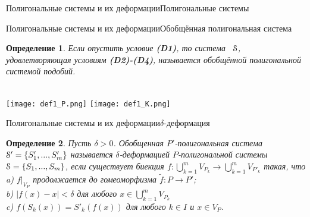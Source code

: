 \documentclass[aspectratio=1610, 10pt, notheorems]{beamer}
\newtheorem{theorem}     {Теорема}
\newtheorem{definition}  {Определение}
\begin{document}
\begin{frame}{Полигональные системы и их деформации}{Полигональные системы}
\end{frame}


\begin{frame}{Полигональные системы и их деформации}{Обобщённая полигональная система}
\begin{definition}	
Если опустить условие {\bf (D1)}, то система \ ${\EuScript S} $, удовлетворяющая условиям {\bf (D2)-(D4)},
называется  обобщённой полигональной системой подобий.
\end{definition}
\;\\
\texttt{[image: def1\_P.png]}
\hfill
\texttt{[image: def1\_K.png]}
\end{frame}


\begin{frame}{Полигональные системы и их деформации}{$\delta$-деформация}
\begin{definition}
Пусть $\delta>0$. 
Обобщенная $P'$-полигональная система ${\EuScript S}'=\{S'_1,...,S'_m\}$ называется $\delta$-деформацией $P$-полигональной системы ${\EuScript S}=\{S_1,...,S_m\}$, если существует биекция $f:\bigcup\limits_{k=1}^m V_{P_k}\to \bigcup\limits_{k=1}^m V_{P'_k}$ такая, что\\
a) $f|_{V_P}$ продолжается до гомеоморфизма $\tilde f: P\to  P'$; \\ 
b) $|f(x)-x|<\delta$  для любого $x\in \bigcup\limits_{k=1}^m V_{P_k}$\\  
c) $f(S_k(x))=S'_k(f(x))$ для любого $k\in I$ и $x\in V_P$.
\end{definition}
\end{frame}
\end{document}
